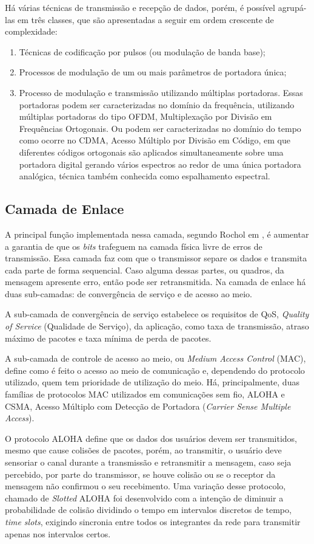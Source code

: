 Há várias técnicas de transmissão e recepção de dados, porém, é possível agrupá-las em três classes, que são apresentadas a seguir em ordem crescente de complexidade:
\begin{enumerate}
      \item Técnicas de codificação por pulsos (ou modulação de banda base);
      \item Processos de modulação de um ou mais parâmetros de portadora única;
      \item Processo de modulação e transmissão utilizando múltiplas portadoras. Essas portadoras podem ser caracterizadas no domínio da frequência, utilizando múltiplas portadoras do tipo OFDM, Multiplexação por Divisão em Frequências Ortogonais. Ou podem ser caracterizadas no domínio do tempo como ocorre no CDMA, Acesso Múltiplo por Divisão em Código, em que diferentes códigos ortogonais são aplicados simultaneamente sobre uma portadora digital gerando vários espectros ao redor de uma única portadora analógica, técnica também conhecida como espalhamento espectral.
\end{enumerate}

\subsection{Camada de Enlace}
A principal função implementada nessa camada, segundo Rochol em \cite{rochol2018sistemas}, é aumentar a garantia de que os \emph{bits} trafeguem na camada física livre de erros de transmissão. Essa camada faz com que o transmissor separe os dados e transmita cada parte de forma sequencial. Caso alguma dessas partes, ou quadros, da mensagem apresente erro, então pode ser retransmitida. Na camada de enlace há duas sub-camadas: de convergência de serviço e de acesso ao meio.

A sub-camada de convergência de serviço estabelece os requisitos de QoS, \emph{Quality of Service} (Qualidade de Serviço), da aplicação, como taxa de transmissão, atraso máximo de pacotes e taxa mínima de perda de pacotes.

A sub-camada de controle de acesso ao meio, ou \emph{Medium Access Control} (MAC), define como é feito o acesso ao meio de comunicação e, dependendo do protocolo utilizado, quem tem prioridade de utilização do meio. Há, principalmente, duas famílias de protocolos MAC utilizados em comunicações sem fio, ALOHA e CSMA, Acesso Múltiplo com Detecção de Portadora (\emph{Carrier Sense Multiple Access}).

O protocolo ALOHA define que os dados dos usuários devem ser transmitidos, mesmo que cause colisões de pacotes, porém, ao transmitir, o usuário deve sensoriar o canal durante a transmissão e retransmitir a mensagem, caso seja percebido, por parte do transmissor, se houve colisão ou se o receptor da mensagem não confirmou o seu recebimento. Uma variação desse protocolo, chamado de \emph{Slotted} ALOHA foi desenvolvido com a intenção de diminuir a probabilidade de colisão dividindo o tempo em intervalos discretos de tempo, \emph{time slots}, exigindo sincronia entre todos os integrantes da rede para transmitir apenas nos intervalos certos.

